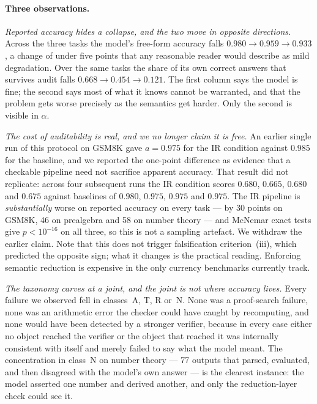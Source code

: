 \documentclass[11pt,a4paper]{article}
\begin{document}
\paragraph{Three observations.}
\textit{Reported accuracy hides a collapse, and the two move in opposite
directions.}  Across the three tasks the model's free-form accuracy falls
$0.980 \to 0.959 \to 0.933$, a change of under five points that any reasonable
reader would describe as mild degradation.  Over the same tasks the share of its
own correct answers that survives audit falls $0.668 \to 0.454 \to 0.121$.  The
first column says the model is fine; the second says most of what it knows
cannot be warranted, and that the problem gets worse precisely as the semantics
get harder.  Only the second is visible in $\alpha$.

\textit{The cost of auditability is real, and we no longer claim it is free.}
An earlier single run of this protocol on GSM8K gave $a = 0.975$ for the IR
condition against $0.985$ for the baseline, and we reported the one-point
difference as evidence that a checkable pipeline need not sacrifice apparent
accuracy.  That result did not replicate: across four subsequent runs the IR
condition scores $0.680$, $0.665$, $0.680$ and $0.675$ against baselines of
$0.980$, $0.975$, $0.975$ and $0.975$.  The IR pipeline is
\emph{substantially} worse on reported accuracy on every task --- by 30 points
on GSM8K, 46 on prealgebra and 58 on number theory --- and McNemar exact tests
give $p < 10^{-16}$ on all three, so this is not a sampling artefact.  We
withdraw the earlier claim.  Note that this does not trigger falsification
criterion~(iii), which predicted the opposite sign; what it changes is the
practical reading.  Enforcing semantic reduction is expensive in the only
currency benchmarks currently track.

\textit{The taxonomy carves at a joint, and the joint is not where accuracy
lives.}  Every failure we observed fell in classes~A, T, R or~N.  None was a
proof-search failure, none was an arithmetic error the checker could have caught
by recomputing, and none would have been detected by a stronger verifier,
because in every case either no object reached the verifier or the object that
reached it was internally consistent with itself and merely failed to say what
the model meant.  The concentration in class~N on number theory --- 77 outputs
that parsed, evaluated, and then disagreed with the model's own answer --- is
the clearest instance: the model asserted one number and derived another, and
only the reduction-layer check could see it.
\end{document}
